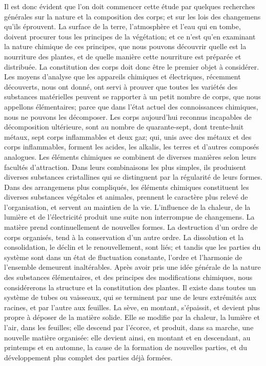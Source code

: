 Il est donc évident que l'on doit commencer cette étude par quelques recherches générales sur la nature et la composition des corps; et sur les lois des changemens qu'ils éprouvent. La surface de la terre, l'atmosphère et l'eau qui en tombe, doivent procurer tous les principes de la végétation; et ce n'est qu'en examinant la nature chimique de ces principes, que nous pouvons découvrir quelle est la nourriture des plantes, et de quelle manière cette nourriture est préparée et distribuée. La constitution des corps doit donc être le premier objet à considérer.\setcounter{page}{334} Les moyens d'analyse que les appareils chimiques et électriques, récemment découverts, nous ont donné, ont servi à prouver que toutes les variétés des substances matérielles peuvent se rapporter à un petit nombre de corps, que nous appellons élémentaires; parce que dans l'état actuel des connoissances chimiques, nous ne pouvons les décomposer. Les corps aujourd'hui reconnus incapables de décomposition ultérieure, sont au nombre de quarante-sept, dont trente-huit métaux, sept corps inflammables et deux gaz; qui, unis avec des métaux et des corps inflammables, forment les acides, les alkalis, les terres et d'autres composés analogues. Les éléments chimiques se combinent de diverses manières selon leurs facultés d'attraction. Dans leurs combinaisons les plus simples, ils produisent diverses substances cristallines qui se distinguent par la régularité de leurs formes. Dans des arrangemens plus compliqués, les éléments chimiques constituent les diverses substances végétales et animales, prennent le caractère plus relevé de l'organisation, et servent au maintien de la vie. L'influence de la chaleur, de la lumière et de l'électricité produit une suite non interrompue de changemens. La matière prend continuellement de\setcounter{page}{335} nouvelles formes. La destruction d'un ordre de corps organisés, tend à la conservation d'un autre ordre. La dissolution et la consolidation, le déclin et le renouvellement, sont liés; et tandis que les parties du système sont dans un état de fluctuation constante, l'ordre et l'harmonie de l'ensemble demeurent inaltérables.
Après avoir pris une idée générale de la nature des substances élémentaires, et des principes des modifications chimiques, nous considérerons la structure et la constitution des plantes. Il existe dans toutes un système de tubes ou vaisseaux, qui se terminent par une de leurs extrémités aux racines, et par l'autre aux feuilles. La sève, en montant, s'épaissit, et devient plus propre à déposer de la matière solide. Elle se modifie par la chaleur, la lumière et l'air, dans les feuilles; elle descend par l'écorce, et produit, dans sa marche, une nouvelle matière organisée: elle devient ainsi, en montant et en descendant, au printemps et en automne, la cause de la formation de nouvelles parties, et du développement plus complet des parties déjà formées.
